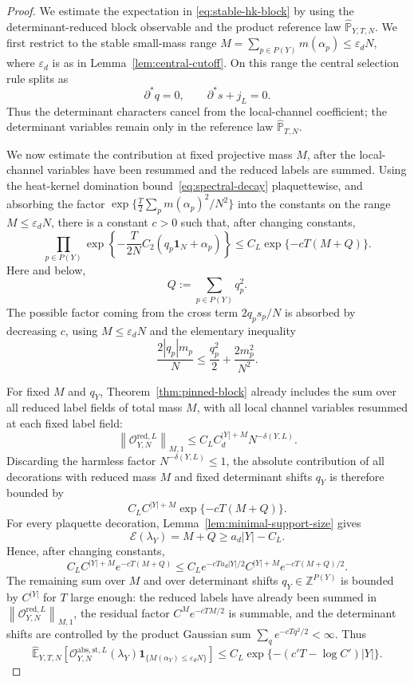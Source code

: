 \documentclass[11pt,a4paper,reqno]{amsart}
\theoremstyle{definition}
\theoremstyle{remark}
\newcommand\Z{{\mathbb{Z}}}
\newcommand\E{{\mathbb E}}
\newcommand\Pbb{{\mathbb{P}}}
\begin{document}
\begin{proof}
We estimate the expectation in \eqref{eq:stable-hk-block} by using the determinant-reduced block observable and the product reference law $\widehat\Pbb_{Y,T,N}$. We first restrict to the stable small-mass range $M=\sum_{p\in P(Y)}m(\alpha_p)\le \varepsilon_d N,$ where $\varepsilon_d$ is as in Lemma~\ref{lem:central-cutoff}.  On this range the central selection rule splits as
\[
\partial^*q=0,
\qquad
\partial^*s+j_L=0.
\]
Thus the determinant characters cancel from the local-channel coefficient; the determinant variables remain only in the reference law $\widehat\Pbb_{T,N}$.

We now estimate the contribution at fixed projective mass $M$, after the local-channel variables have been resummed and the reduced labels are summed.  Using the heat-kernel domination bound~\eqref{eq:spectral-decay} plaquettewise, and absorbing the factor $\exp\{\frac{T}{2}\sum_p m(\alpha_p)^2/N^2\}$ into the constants on the range $M\le\varepsilon_dN$, there is a constant $c>0$ such that, after changing constants,
\[
\prod_{p\in P(Y)}
\exp\left\{-\frac{T}{2N}C_2(q_p\mathbf 1_N+\alpha_p)\right\}
\le C_L\exp\{-cT(M+Q)\}.
\]
Here and below,
\[
Q:=\sum_{p\in P(Y)}q_p^2.
\]
The possible factor coming from the cross term $2q_ps_p/N$ is absorbed by decreasing $c$, using $M\le\varepsilon_dN$ and the elementary inequality
\[
\frac{2|q_p|m_p}{N}
\le \frac{q_p^2}{2}+\frac{2m_p^2}{N^2}.
\]

For fixed $M$ and $q_Y$, Theorem~\ref{thm:pinned-block} already includes the sum over all reduced label fields of total mass $M$, with all local channel variables resummed at each fixed label field:
\[
\left\|\mathcal O_{Y,N}^{\mathrm{red},L}\right\|_{M,1}
\le C_LC_d^{|Y|+M}N^{-\delta(Y,L)} .
\]
Discarding the harmless factor $N^{-\delta(Y,L)}\le1$, the absolute contribution of all decorations with reduced mass $M$ and fixed determinant shifts $q_Y$ is therefore bounded by
\[
C_L C^{|Y|+M}\exp\{-cT(M+Q)\} .
\]
For every plaquette decoration, Lemma~\ref{lem:minimal-support-size} gives
\[
\mathcal E(\lambda_Y)=M+Q\ge a_d|Y|-C_L.
\]
Hence, after changing constants,
\[
C_L C^{|Y|+M}e^{-cT(M+Q)}
\le
C_L e^{-cTa_d|Y|/2}
C^{|Y|+M}e^{-cT(M+Q)/2}.
\]
The remaining sum over $M$ and over determinant shifts $q_Y\in\Z^{P(Y)}$ is bounded by $C^{|Y|}$ for $T$ large enough: the reduced labels have already been summed in $\left\|\mathcal O_{Y,N}^{\mathrm{red},L}\right\|_{M,1}$, the residual factor $C^M e^{-cTM/2}$ is summable, and the determinant shifts are controlled by the product Gaussian sum $\sum_q e^{-cTq^2/2}<\infty$.  Thus
\[
\widehat\E_{Y,T,N}\left[
\mathcal O_{Y,N}^{\mathrm{abs},\mathrm{st},L}(\lambda_Y)
\mathbf 1_{\{M(\alpha_Y)\le\varepsilon_dN\}}
\right]
\le
C_L\exp\{-(c'T-\log C')|Y|\}.
\]


\end{proof}
\end{document}
